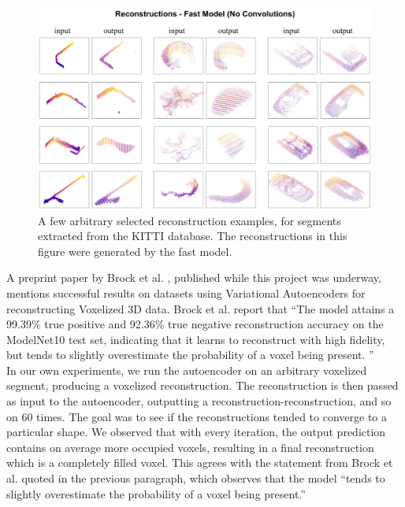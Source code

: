 \begin{figure}
  \centering
  \includegraphics[width=5.2in]{images/noconvreconstructions.pdf}
  \caption{A few arbitrary selected reconstruction examples, for segments extracted from the KITTI database. The reconstructions in this figure were generated by the fast model.}
  \label{fig:trainingcost}
\end{figure}

A preprint paper by Brock et al.  \cite{voxel-autoencoder}, published while this project was underway,  mentions successful results on datasets using Variational Autoencoders for reconstructing Voxelized 3D data.
Brock et al. \cite{voxel-autoencoder} report that ``The model attains a 99.39\% true positive and 92.36\% true negative reconstruction accuracy on the ModelNet10 test set, indicating that it learns to reconstruct with high fidelity, but tends to slightly overestimate the probability of a voxel being present. ''\\

In our own experiments, we run the autoencoder on an arbitrary voxelized segment, producing a voxelized reconstruction. The reconstruction is then passed as input to the autoencoder, outputting a reconstruction-reconstruction, and so on 60 times. The goal was to see if the reconstructions tended to converge to a particular shape. We observed that with every iteration, the output prediction contains on average more occupied voxels, resulting in a final reconstruction which is a completely filled voxel. This agrees with the statement from Brock et al. \cite{voxel-autoencoder} quoted in the previous paragraph, which observes that the model ``tends to slightly overestimate the probability of a voxel being present.''\\

